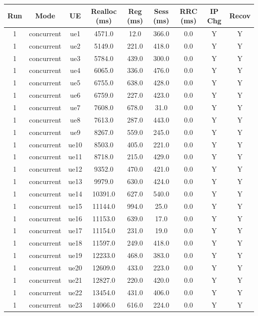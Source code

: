 \begin{table}[ht]
\centering
\begin{tabular}{|c|c|c|c|c|c|c|c|c|}
\hline
Run & Mode & UE & Realloc (ms) & Reg (ms) & Sess (ms) & RRC (ms) & IP Chg & Recov \\
\hline
1 & concurrent & ue1 & 4571.0 & 12.0 & 366.0 & 0.0 & Y & Y \\
1 & concurrent & ue2 & 5149.0 & 221.0 & 418.0 & 0.0 & Y & Y \\
1 & concurrent & ue3 & 5784.0 & 439.0 & 300.0 & 0.0 & Y & Y \\
1 & concurrent & ue4 & 6065.0 & 336.0 & 476.0 & 0.0 & Y & Y \\
1 & concurrent & ue5 & 6755.0 & 638.0 & 428.0 & 0.0 & Y & Y \\
1 & concurrent & ue6 & 6759.0 & 227.0 & 423.0 & 0.0 & Y & Y \\
1 & concurrent & ue7 & 7608.0 & 678.0 & 31.0 & 0.0 & Y & Y \\
1 & concurrent & ue8 & 7613.0 & 287.0 & 443.0 & 0.0 & Y & Y \\
1 & concurrent & ue9 & 8267.0 & 559.0 & 245.0 & 0.0 & Y & Y \\
1 & concurrent & ue10 & 8503.0 & 405.0 & 221.0 & 0.0 & Y & Y \\
1 & concurrent & ue11 & 8718.0 & 215.0 & 429.0 & 0.0 & Y & Y \\
1 & concurrent & ue12 & 9352.0 & 470.0 & 421.0 & 0.0 & Y & Y \\
1 & concurrent & ue13 & 9979.0 & 630.0 & 424.0 & 0.0 & Y & Y \\
1 & concurrent & ue14 & 10391.0 & 627.0 & 540.0 & 0.0 & Y & Y \\
1 & concurrent & ue15 & 11144.0 & 994.0 & 25.0 & 0.0 & Y & Y \\
1 & concurrent & ue16 & 11153.0 & 639.0 & 17.0 & 0.0 & Y & Y \\
1 & concurrent & ue17 & 11154.0 & 231.0 & 19.0 & 0.0 & Y & Y \\
1 & concurrent & ue18 & 11597.0 & 249.0 & 418.0 & 0.0 & Y & Y \\
1 & concurrent & ue19 & 12233.0 & 468.0 & 383.0 & 0.0 & Y & Y \\
1 & concurrent & ue20 & 12609.0 & 433.0 & 223.0 & 0.0 & Y & Y \\
1 & concurrent & ue21 & 12827.0 & 220.0 & 420.0 & 0.0 & Y & Y \\
1 & concurrent & ue22 & 13454.0 & 431.0 & 406.0 & 0.0 & Y & Y \\
1 & concurrent & ue23 & 14066.0 & 616.0 & 224.0 & 0.0 & Y & Y \\

\end{tabular}
\end{table}
